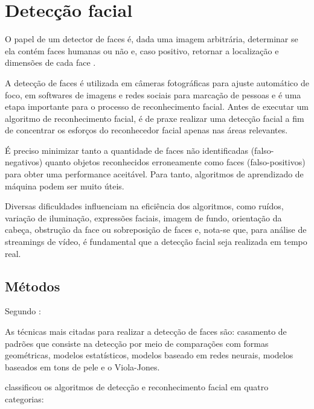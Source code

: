 \chapter{Detecção facial}\label{cap:detecao_facial}

O papel de um detector de faces é, dada uma imagem arbitrária, determinar se ela contém faces humanas ou não e, caso positivo, retornar a localização e dimensões de cada face \cite{censtudy}.

A detecção de faces é utilizada em câmeras fotográficas para ajuste automático de foco, em softwares de imagens e redes sociais para marcação de pessoas e é uma etapa importante para o processo de reconhecimento facial. Antes de executar um algoritmo de reconhecimento facial, é de praxe realizar uma detecção facial a fim de concentrar os esforços do reconhecedor facial apenas nas áreas relevantes.

É preciso minimizar tanto a quantidade de faces não identificadas (falso-negativos) quanto objetos reconhecidos erroneamente como faces (falso-positivos) para obter uma performance aceitável. Para tanto, algoritmos de aprendizado de máquina podem ser muito úteis.

Diversas dificuldades influenciam na eficiência dos algoritmos, como ruídos, variação de iluminação, expressões faciais, imagem de fundo, orientação da cabeça, obstrução da face ou sobreposição de faces \cite{de2015processo} e, nota-se que, para análise de streamings de vídeo, é fundamental que a detecção facial seja realizada em tempo real.

\section{Métodos}

Segundo :

\begin{citacao}
As técnicas mais citadas para realizar a detecção de faces são: casamento de padrões que consiste na detecção por meio de comparações com formas geométricas, modelos estatísticos, modelos baseado em redes neurais, modelos baseados em tons de pele e o Viola-Jones.
\end{citacao}

 classificou os algoritmos de detecção e reconhecimento facial em quatro categorias:


